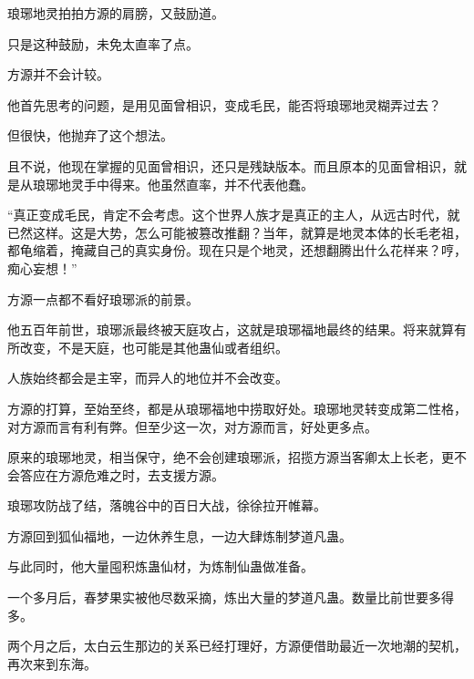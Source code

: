 \begin{this_body}
琅琊地灵拍拍方源的肩膀，又鼓励道。

只是这种鼓励，未免太直率了点。

方源并不会计较。

他首先思考的问题，是用见面曾相识，变成毛民，能否将琅琊地灵糊弄过去？

但很快，他抛弃了这个想法。

且不说，他现在掌握的见面曾相识，还只是残缺版本。而且原本的见面曾相识，就是从琅琊地灵手中得来。他虽然直率，并不代表他蠢。

“真正变成毛民，肯定不会考虑。这个世界人族才是真正的主人，从远古时代，就已然这样。这是大势，怎么可能被篡改推翻？当年，就算是地灵本体的长毛老祖，都龟缩着，掩藏自己的真实身份。现在只是个地灵，还想翻腾出什么花样来？哼，痴心妄想！”

方源一点都不看好琅琊派的前景。

他五百年前世，琅琊派最终被天庭攻占，这就是琅琊福地最终的结果。将来就算有所改变，不是天庭，也可能是其他蛊仙或者组织。

人族始终都会是主宰，而异人的地位并不会改变。

方源的打算，至始至终，都是从琅琊福地中捞取好处。琅琊地灵转变成第二性格，对方源而言有利有弊。但至少这一次，对方源而言，好处更多点。

原来的琅琊地灵，相当保守，绝不会创建琅琊派，招揽方源当客卿太上长老，更不会答应在方源危难之时，去支援方源。

琅琊攻防战了结，落魄谷中的百日大战，徐徐拉开帷幕。

方源回到狐仙福地，一边休养生息，一边大肆炼制梦道凡蛊。

与此同时，他大量囤积炼蛊仙材，为炼制仙蛊做准备。

一个多月后，春梦果实被他尽数采摘，炼出大量的梦道凡蛊。数量比前世要多得多。

两个月之后，太白云生那边的关系已经打理好，方源便借助最近一次地潮的契机，再次来到东海。

\end{this_body}

